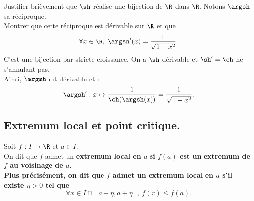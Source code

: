 \documentclass[11pt]{article}
\begin{document}
\begin{ex}{}{}
    Justifier brièvement que $\sh$ réalise une bijection de $\R$ dans $\R$. Notons $\argsh$ sa réciproque.\\
    Montrer que cette réciproque est dérivable sur $\R$ et que
    \begin{equation*}
        \forall x \in \R, ~ \argsh'(x)=\frac{1}{\sqrt{1+x^2}}.
    \end{equation*}
    \tcblower
    C'est une bijection par stricte croissance. On a $\sh$ dérivable et $\sh'=\ch$ ne s'annulant pas.\\
    Ainsi, $\argsh$ est dérivable et :
    \begin{equation*}
        \argsh':x\mapsto\frac{1}{\ch(\argsh(x))}=\frac{1}{\sqrt{1+x^2}}.
    \end{equation*}
\end{ex}

\subsection{Extremum local et point critique.}

\begin{defi}{}{}
    Soit $f:I\to\R$ et $a\in I$.\\
    On dit que $f$ admet un \bf{extremum local} en $a$ si $f(a)$ est un extremum de $f$ au voisinage de $a$.\\
    Plus précisément, on dit que $f$ admet un extremum local en $a$ s'il existe $\eta>0$ tel que
    \begin{equation*}
        \forall x \in I\cap[a-\eta, a+\eta], ~ f(x) \leq f(a).
    \end{equation*}
\end{defi}
\end{document}
